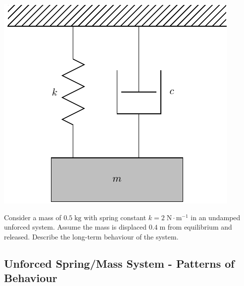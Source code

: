 \includegraphics[width=0.4\linewidth]{graphics/notes_08_hanging_mass}




\newpage
\problem  Consider a mass of $0.5 \; \text{kg}$ with spring constant $k = 2 \; \text{N}
  \cdot \text{m}^{-1}$ in an undamped unforced system.  Assume the mass is
  displaced $0.4 \; \text{m}$ from equilibrium and released.  Describe the
  long-term behaviour of the system.

\newpage
{}
\subsection*{Unforced Spring/Mass System - Patterns of Behaviour}

